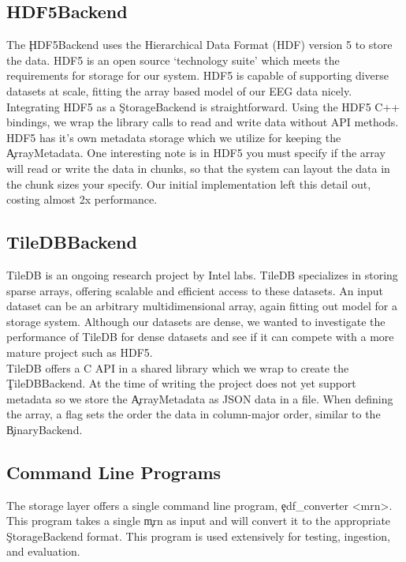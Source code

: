 \subsection{HDF5Backend}

The \c{HDF5Backend} uses the Hierarchical Data Format (HDF) version 5
\cite{hdf5} to store the data. HDF5 is an open source `technology suite' which
meets the requirements for storage for our system. HDF5 is capable of
supporting diverse datasets at scale, fitting the array based model of our
EEG data nicely. \\

Integrating HDF5 as a \c{StorageBackend} is straightforward. Using the HDF5 C++
bindings, we wrap the library calls to read and write data without API methods.
HDF5 has it's own metadata storage which we utilize for keeping the
\c{ArrayMetadata}. One interesting note is in HDF5 you must specify if the
array will read or write the data in chunks, so that the system can layout the
data in the chunk sizes your specify. Our initial implementation left this
detail out, costing almost 2x performance.

\subsection{TileDBBackend}

TileDB\cite{tiledb} is an ongoing research project by Intel labs. TileDB
specializes in storing sparse arrays, offering scalable and efficient access to
these datasets. An input dataset can be an arbitrary multidimensional array,
again fitting out model for a storage system. Although our datasets are dense,
we wanted to investigate the performance of TileDB for dense datasets and see
if it can compete with a more mature project such as HDF5.\\

TileDB offers a C API in a shared library which we wrap to create the
\c{TileDBBackend}. At the time of writing the project does not yet support
metadata so we store the \c{ArrayMetadata} as JSON data in a file. When
defining the array, a flag sets the order the data in column-major order,
similar to the \c{BinaryBackend}.

\subsection{Command Line Programs}\label{storage-ch:implementation-cmd}

The storage layer offers a single command line program,
\c{edf\_converter <mrn>}.  This program takes a single \c{mrn} as input
and will convert it to the appropriate \c{StorageBackend} format. This
program is used extensively for testing, ingestion, and evaluation.

